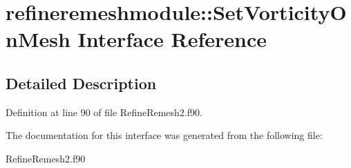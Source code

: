 \hypertarget{interfacerefineremeshmodule_1_1_set_vorticity_on_mesh}{\section{refineremeshmodule\+:\+:Set\+Vorticity\+On\+Mesh Interface Reference}
\label{interfacerefineremeshmodule_1_1_set_vorticity_on_mesh}
}


\subsection{Detailed Description}


Definition at line 90 of file Refine\+Remesh2.\+f90.



The documentation for this interface was generated from the following file\+:\begin{DoxyCompactItemize}
\item 
Refine\+Remesh2.\+f90\end{DoxyCompactItemize}
